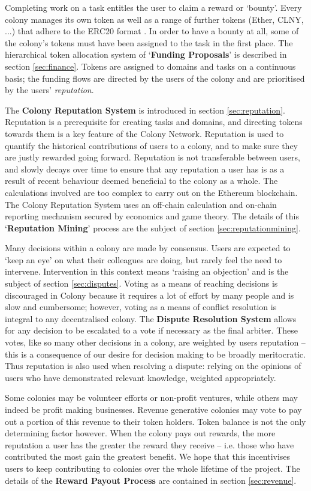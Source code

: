 Completing work on a task entitles the user to claim a reward or `bounty'. Every colony manages its own token as well as a range of further tokens (Ether, CLNY, ...) that adhere to the ERC20 format \cite{erc20}. In order to have a bounty at all, some of the colony's tokens must have been assigned to the task in the first place. The hierarchical token allocation system of `\textbf{Funding Proposals}' is described in section \ref{sec:finance}. Tokens are assigned to domains and tasks on a continuous basis; the funding flows are directed by the users of the colony and are prioritised by the users' \emph{reputation}. 

The \textbf{Colony Reputation System} is introduced in section \ref{sec:reputation}. Reputation is a prerequisite for creating tasks and domains, and directing tokens towards them is a key feature of the Colony Network. Reputation is used to quantify the historical contributions of users to a colony, and to make sure they are justly rewarded going forward. Reputation is not transferable between users, and slowly decays over time to ensure that any reputation a user has is as a result of recent behaviour deemed beneficial to the colony as a whole. The calculations involved are too complex to carry out on the Ethereum blockchain. The Colony Reputation System uses an off-chain calculation and on-chain reporting mechanism secured by economics and game theory. The details of this `\textbf{Reputation Mining}' process are the subject of section \ref{sec:reputationmining}.

Many decisions within a colony are made by consensus. Users are expected to `keep an eye' on what their colleagues are doing, but rarely feel the need to intervene. Intervention in this context means `raising an objection' and is the subject of section \ref{sec:disputes}. Voting as a means of reaching decisions is discouraged in Colony because it requires a lot of effort by many people and is slow and cumbersome; however, voting as a means of conflict resolution is integral to any decentralised colony. The \textbf{Dispute Resolution System} allows for any decision to be escalated to a vote if necessary as the final arbiter. These votes, like so many other decisions in a colony, are weighted by users reputation -- this is a consequence of our desire for decision making to be broadly meritocratic. Thus  reputation is also used when resolving a dispute: relying on the opinions of users who have demonstrated relevant knowledge, weighted appropriately. 

Some colonies may be volunteer efforts or non-profit ventures, while others may indeed be profit making businesses. Revenue generative colonies may vote to pay out a portion of this revenue to their token holders. Token balance is not the only determining factor however. When the colony pays out rewards, the more reputation a user has the greater the reward they receive -- i.e. those who have contributed the most gain the greatest benefit. We hope that this incentivises users to keep contributing to colonies over the whole lifetime of the project. The details of the \textbf{Reward Payout Process} are contained in section \ref{sec:revenue}.
